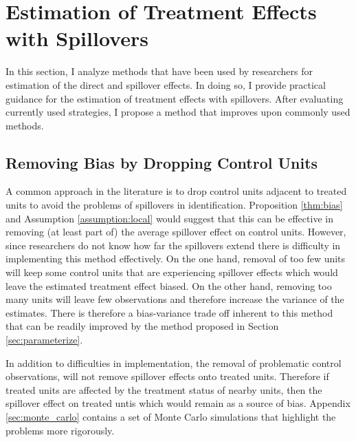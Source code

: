 \documentclass[11pt]{article}
\begin{document}
\section{Estimation of Treatment Effects with Spillovers}
\label{sec:estimation}

In this section, I analyze methods that have been used by researchers for estimation of the direct and spillover effects. In doing so, I provide practical guidance for the estimation of treatment effects with spillovers. After evaluating currently used strategies, I propose a method that improves upon commonly used methods. 

\subsection{Removing Bias by Dropping Control Units}

A common approach in the literature is to drop control units adjacent to treated units to avoid the problems of spillovers in identification. Proposition \ref{thm:bias} and Assumption \ref{assumption:local} would suggest that this can be effective in removing (at least part of) the average spillover effect on control units. However, since researchers do not know how far the spillovers extend there is difficulty in implementing this method effectively. On the one hand, removal of too few units will keep some control units that are experiencing spillover effects which would leave the estimated treatment effect biased. On the other hand, removing too many units will leave few observations and therefore increase the variance of the estimates. There is therefore a bias-variance trade off inherent to this method that can be readily improved by the method proposed in Section \ref{sec:parameterize}.

In addition to difficulties in implementation, the removal of problematic control observations, will not remove spillover effects onto treated units. Therefore if treated units are affected by the treatment status of nearby units, then the spillover effect on treated untis which would remain as a source of bias. Appendix \ref{sec:monte_carlo} contains a set of Monte Carlo simulations that highlight the problems more rigorously.

\end{document}
